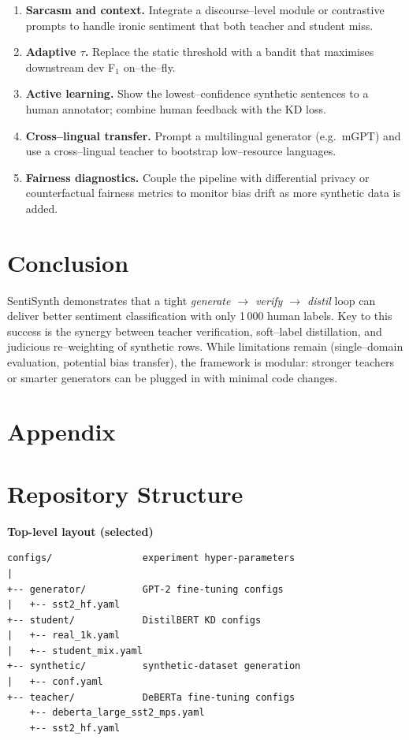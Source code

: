 \documentclass[11pt]{article}
\begin{document}
\begin{enumerate}
  \item \textbf{Sarcasm and context.}
    Integrate a discourse--level module or contrastive prompts to
    handle ironic sentiment that both teacher and student miss.
  \item \textbf{Adaptive $\tau$.}
    Replace the static threshold with a
    bandit that maximises downstream dev F$_1$ on--the--fly.
  \item \textbf{Active learning.}
    Show the lowest--confidence synthetic sentences to a human
    annotator; combine human feedback with the KD loss.
  \item \textbf{Cross--lingual transfer.}
    Prompt a multilingual generator (e.g.\ mGPT) and use a
    cross--lingual teacher to bootstrap low--resource languages.
  \item \textbf{Fairness diagnostics.}
    Couple the pipeline with differential privacy or
    counterfactual fairness metrics to monitor bias drift as more
    synthetic data is added.
\end{enumerate}

\vspace{1em}
\section{Conclusion}
\label{sec:conclusion}

SentiSynth demonstrates that a tight
\emph{generate $\rightarrow$ verify $\rightarrow$ distil} loop can
deliver better sentiment classification with only
1\,000 human labels.  Key to this success is the synergy between
teacher verification, soft--label distillation, and judicious
re--weighting of synthetic rows.  While limitations remain
(single--domain evaluation, potential bias transfer), the framework is
modular: stronger teachers or smarter generators can be plugged in
with minimal code changes.

\appendix
\section{Appendix}
\section{Repository Structure}
\label{sec:appendix-structure}
\noindent\textbf{Top-level layout (selected)}
\begin{verbatim}
configs/                experiment hyper-parameters
|
+-- generator/          GPT-2 fine-tuning configs
|   +-- sst2_hf.yaml
+-- student/            DistilBERT KD configs
|   +-- real_1k.yaml
|   +-- student_mix.yaml
+-- synthetic/          synthetic-dataset generation
|   +-- conf.yaml
+-- teacher/            DeBERTa fine-tuning configs
    +-- deberta_large_sst2_mps.yaml
    +-- sst2_hf.yaml
\end{verbatim}
\end{document}
